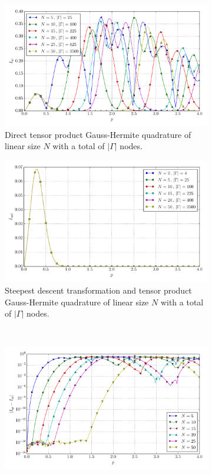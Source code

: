 \documentclass[a4paper,10pt]{article}
\begin{document}
\begin{figure}[ht!]
  \begin{subfigure}[t]{0.5\linewidth}
    \includegraphics[width=\linewidth]{./plots/tp_2d_conv_p_(1,0)_(0,1)_val_qr.pdf}
    \caption{Direct tensor product Gauss-Hermite quadrature of linear size $N$ with a total of $|\Gamma|$ nodes.}
    \label{fig:tp_2d_conv_p_10_01_val_qr}
  \end{subfigure}
  \begin{subfigure}[t]{0.5\linewidth}
    \includegraphics[width=\linewidth]{./plots/tp_2d_conv_p_(1,0)_(0,1)_val_nsd.pdf}
    \caption{Steepest descent transformation and tensor product Gauss-Hermite quadrature of linear size $N$ with a total of $|\Gamma|$ nodes.}
    \label{fig:tp_2d_conv_p_10_01_val_nsd}
  \end{subfigure} \\
  \begin{subfigure}[t]{0.5\linewidth}
    \includegraphics[width=\linewidth]{./plots/tp_2d_conv_p_(1,0)_(0,1)_err_qr.pdf}

\end{subfigure}
\end{figure}
\end{document}
